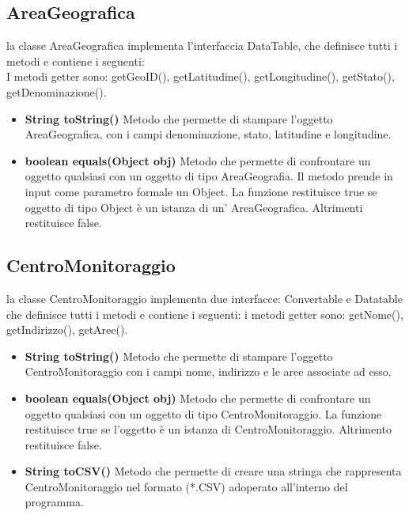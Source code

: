 \documentclass[a4paper, 12pt]{report}
\begin{document}
			\subsection{AreaGeografica}
			la classe AreaGeografica implementa l'interfaccia DataTable, che definisce tutti i metodi e contiene i seguenti:\\
			I metodi getter sono: getGeoID(), getLatitudine(), getLongitudine(), getStato(), getDenominazione().
			\begin{itemize}
				\item \textbf{String toString()}
				Metodo che permette di stampare l'oggetto AreaGeografica, con i campi denominazione, stato, latitudine e longitudine.
				\item \textbf{boolean equals(Object obj)}
				Metodo che permette di confrontare un oggetto qualsiasi con un oggetto di tipo AreaGeografia. Il metodo prende in input come parametro formale un Object. La funzione restituisce true se oggetto di tipo Object è un istanza di un' AreaGeografica. Altrimenti restituisce false. 
			\end{itemize}

			\subsection{CentroMonitoraggio}
			la classe CentroMonitoraggio implementa due interfacce: Convertable e Datatable che definisce tutti i metodi e contiene i seguenti:
			i metodi getter sono: getNome(), getIndirizzo(), getAree().
			\begin{itemize}
				\item \textbf{String toString()}
				Metodo che permette di stampare l'oggetto CentroMonitoraggio con i campi nome, indirizzo e le aree associate ad esso.
				\item \textbf{boolean equals(Object obj)}
				Metodo che permette di confrontare un oggetto qualsiasi con un oggetto di tipo CentroMonitoraggio. La funzione restituisce true se l'oggetto è un istanza di CentroMonitoraggio. Altrimento restituisce false.
				\item \textbf{String toCSV()}
				Metodo che permette di creare una stringa che rappresenta CentroMonitoraggio nel formato (*.CSV) adoperato all'interno del programma.
			\end{itemize}
\end{document}
